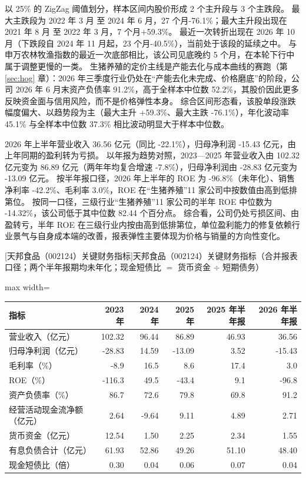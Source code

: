  以 25\% 的 ZigZag 阈值划分，样本区间内股价形成 2 个主升段与 3 个主跌段。 最大主跌段为 2022 年 3 月 至 2024 年 6 月，27 个月-76.1\%；最大主升段出现在 2021 年 8 月 至 2022 年 3 月，7 个月+59.3\%。 最近一次转折出现在 2026 年 10 月（下跌段自 2024 年 11 月起，23 个月-40.5\%），当前处于该段的延续之中。 与申万农林牧渔指数的最近一次底部相比，该公司见底晚约 5 个月，在本轮下行中属于调整更慢的一类。 生猪养殖的定价主线是产能去化与成本曲线的赛跑（第 \ref{sec:hog} 章）：2026 年三季度行业仍处在“产能去化未完成、价格磨底”的阶段，公司 2026 年 6 月末资产负债率 91.2\%，高于全样本中位数 52.2\%，其股价因此更多反映资金面与信用风险，而不是价格弹性本身。 综合区间形态看，该股单段涨跌幅度偏大、以趋势段为主（最大主升 +59.3\%、最大主跌 -76.1\%），年化波动率 45.1\% 与全样本中位数 37.3\% 相比波动明显大于样本中位数。

 2026 年上半年营业收入 36.56 亿元（同比 -22.1\%），归母净利润 -15.43 亿元，由上年同期的盈利转为亏损。 以年报为趋势对照，2023---2025 年营业收入由 102.32 亿元变为 86.89 亿元（两年年均复合增速 -7.8\%），归母净利润由 -28.83 亿元变为 -13.09 亿元。 按半年报口径，2026 年上半年的 ROE 为 -96.8\%（未年化）、销售净利率 -42.2\%、毛利率 3.0\%，ROE 在“生猪养殖”11 家公司中按数值由高到低排第位。 按同一口径，三级行业“生猪养殖”11 家公司的半年 ROE 中位数为 -14.32\%，该公司低于其中位数 82.44 个百分点。 综合看，公司仍处亏损区间、由盈转亏，半年 ROE 在三级行业内按由高到低排第位，单位盈利能力的修复依赖行业景气与自身成本端的改善，报表弹性主要体现为价格与销量的方向性变化。

\begin{center}\small\setlength{\tabcolsep}{3.4pt}
[天邦食品（002124）关键财务指标]{天邦食品（002124）关键财务指标（合并报表口径；两个半年报期均未年化；现金短债比 $=$ 货币资金 $\div$ 短期债务）}
\begin{adjustbox}{max width=\textwidth}
\begin{tabular}{@{}lrrrrr@{}}
\toprule
指标 & 2023 年 & 2024 年 & 2025 年 & 2025 年半年报 & 2026 年半年报 \\
\midrule
营业收入（亿元） & 102.32 & 96.44 & 86.89 & 46.93 & 36.56 \\
归母净利润（亿元） & -28.83 & 14.59 & -13.09 & 3.52 & -15.43 \\
毛利率（\%） & -8.9 & 16.5 & 8.6 & 17.4 & 3.0 \\
ROE（\%） & -116.3 & 49.5 & -43.4 & 9.1 & -96.8 \\
资产负债率（\%） & 86.7 & 72.6 & 79.8 & 69.8 & 91.2 \\
经营活动现金流净额（亿元） & 2.64 & -9.64 & 9.11 & 4.89 & 2.71 \\
货币资金（亿元） & 12.54 & 1.50 & 2.25 & 2.34 & 1.55 \\
有息负债合计（亿元） & 61.93 & 52.86 & 49.26 & 51.10 & 48.40 \\
现金短债比（倍） & 0.30 & 0.04 & 0.06 & 0.07 & 0.04 \\
\bottomrule
\end{tabular}
\end{adjustbox}
\end{center}

